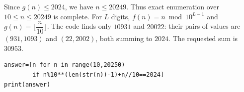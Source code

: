 Since $g(n)\le2024$, we have $n\le20249$. Thus exact enumeration over $10\le n\le20249$ is complete. For $L$ digits, $f(n)=n\bmod10^{L-1}$ and $g(n)=\lfloor\dfrac{n}{10}\rfloor$. The code finds only $10931$ and $20022$: their pairs of values are $(931,1093)$ and $(22,2002)$, both summing to $2024$. The requested sum is $\boxed{30953}$.
\begin{verbatim}
answer=[n for n in range(10,20250)
        if n%10**(len(str(n))-1)+n//10==2024]
print(answer)
\end{verbatim}
